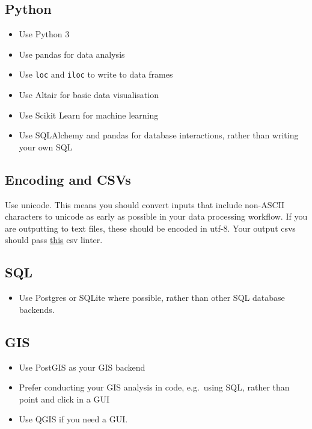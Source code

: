 \documentclass[]{book}
\providecommand{\tightlist}{%
  \setlength{\itemsep}{0pt}\setlength{\parskip}{0pt}}
\begin{document}
\hypertarget{python-1}{%
\subsection{Python}\label{python-1}}

\begin{itemize}
\tightlist
\item
  Use Python 3
\item
  Use pandas for data analysis
\item
  Use \texttt{loc} and \texttt{iloc} to write to data frames
\item
  Use Altair for basic data visualisation
\item
  Use Scikit Learn for machine learning
\item
  Use SQLAlchemy and pandas for database interactions, rather than writing your own SQL
\end{itemize}

\hypertarget{encoding-and-csvs}{%
\subsection{Encoding and CSVs}\label{encoding-and-csvs}}

Use unicode. This means you should convert inputs that include non-ASCII characters to unicode as early as possible in your data processing workflow. If you are outputting to text files, these should be encoded in utf-8. Your output csvs should pass \href{https://csvlint.io/}{this} csv linter.

\hypertarget{sql}{%
\subsection{SQL}\label{sql}}

\begin{itemize}
\tightlist
\item
  Use Postgres or SQLite where possible, rather than other SQL database backends.
\end{itemize}

\hypertarget{gis}{%
\subsection{GIS}\label{gis}}

\begin{itemize}
\tightlist
\item
  Use PostGIS as your GIS backend
\item
  Prefer conducting your GIS analysis in code, e.g.~using SQL, rather than point and click in a GUI
\item
  Use QGIS if you need a GUI.
\end{itemize}
\end{document}
